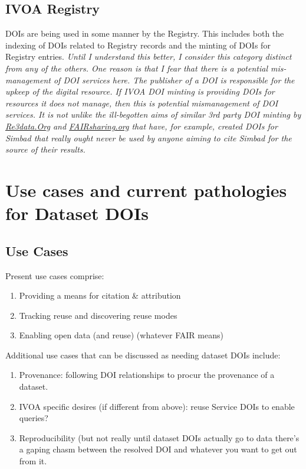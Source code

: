 \documentclass[11pt,a4paper]{ivoa}
\begin{document}
\subsection{IVOA Registry}
\label{sec:intro:ivoa}
DOIs are being used in some manner by the Registry.
This includes both the indexing of DOIs related to Registry records and the minting of DOIs for Registry entries.
\textit{Until I understand this better, I consider this category distinct from any of the others.  One reason is that I fear that there is a potential mis-management of DOI services here. The publisher of a DOI is responsible for the upkeep of the digital resource. If IVOA DOI minting is providing DOIs for resources it does not manage, then this is potential mismanagement of DOI services. It is not unlike the ill-begotten aims of similar 3rd party DOI minting by \url{Re3data.Org} and \url{FAIRsharing.org} that have, for example, created DOIs for Simbad \citep{https://doi.org/10.17616/r39w29,https://doi.org/10.25504/fairsharing.rd6gxr} that really ought never be used by anyone aiming to cite Simbad for the source of their results. }

\section{Use cases and current pathologies for Dataset DOIs }
\label{sec:use}

\subsection{Use Cases}
\label{sec:use:cases}

Present use cases comprise:
\begin{enumerate}
\item Providing a means for citation \& attribution
\item Tracking reuse and discovering reuse modes
\item Enabling open data (and reuse) (whatever FAIR means)
\end{enumerate}

Additional use cases that can be discussed as needing dataset DOIs include:
\begin{enumerate}
\item Provenance: following DOI relationships to procur the provenance of a dataset.
\item IVOA specific desires (if different from above): reuse Service DOIs to enable queries?
\item Reproducibility (but not really until dataset DOIs actually go to data there's a gaping chasm between the resolved DOI and whatever you want to get out from it.
\end{enumerate}
\end{document}
